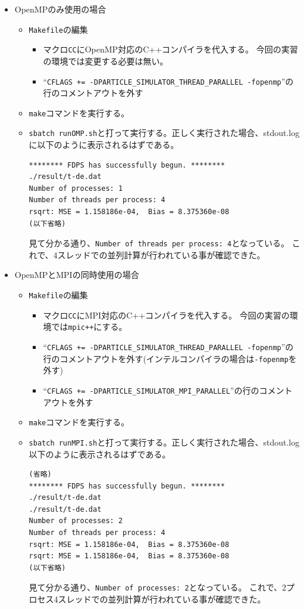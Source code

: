 \documentclass[12pt,a4paper,dvipdfmx]{jarticle}
\begin{document}
\begin{itemize}
\item OpenMPのみ使用の場合
  \begin{itemize}
  \item \texttt{Makefile}の編集
    \begin{itemize}
    \item マクロ\texttt{CC}にOpenMP対応のC++コンパイラを代入する。
          今回の実習の環境では変更する必要は無い。
    \item ``\texttt{CFLAGS += -DPARTICLE\_SIMULATOR\_THREAD\_PARALLEL -fopenmp}''の
      行のコメントアウトを外す
    \end{itemize}
  \item \texttt{make}コマンドを実行する。
  \item \texttt{sbatch runOMP.sh}と打って実行する。正しく実行された場合、stdout.logに以下のように表示されるはずである。
\begin{screen}
\begin{verbatim}
******** FDPS has successfully begun. ********
./result/t-de.dat
Number of processes: 1
Number of threads per process: 4
rsqrt: MSE = 1.158186e-04,  Bias = 8.375360e-08
(以下省略)
\end{verbatim}
\end{screen}
       見て分かる通り、\texttt{Number of threads per process: 4}となっている。
       これで、4スレッドでの並列計算が行われている事が確認できた。
  \end{itemize}

\item OpenMPとMPIの同時使用の場合
  \begin{itemize}
  \item \texttt{Makefile}の編集
    \begin{itemize}
    \item マクロ\texttt{CC}にMPI対応のC++コンパイラを代入する。
          今回の実習の環境では\texttt{mpic++}にする。
    \item ``\texttt{CFLAGS += -DPARTICLE\_SIMULATOR\_THREAD\_PARALLEL -fopenmp}''の
      行のコメントアウトを外す(インテルコンパイラの場合は\texttt{-fopenmp}を外す)
    \item ``\texttt{CFLAGS += -DPARTICLE\_SIMULATOR\_MPI\_PARALLEL}''の行のコメント
      アウトを外す
    \end{itemize}
  \item \texttt{make}コマンドを実行する。
  \item \texttt{sbatch runMPI.sh}と打って実行する。正しく実行された場合、stdout.log以下のように表示されるはずである。
\begin{screen}
\begin{verbatim}
(省略)
******** FDPS has successfully begun. ********
./result/t-de.dat
./result/t-de.dat
Number of processes: 2
Number of threads per process: 4
rsqrt: MSE = 1.158186e-04,  Bias = 8.375360e-08
rsqrt: MSE = 1.158186e-04,  Bias = 8.375360e-08
(以下省略)
\end{verbatim}
\end{screen}
       見て分かる通り、\texttt{Number of processes: 2}となっている。
       これで、2プロセス4スレッドでの並列計算が行われている事が確認できた。
  \end{itemize}


\end{itemize}
\end{document}
